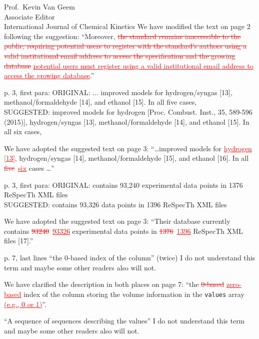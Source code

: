 \documentclass[11pt]{OSUletter}
\newcommand{\addtwo}[1]{{\sloppy\textcolor{red}{\uline{#1}}}}  %
\newcommand{\deletetwo}[1]{\sloppy\textcolor{red}{\sout{#1}}}    %
\begin{document}
\begin{letter}{
               Prof.~Kevin Van Geem\\
               Associate Editor\\
               International Journal of Chemical Kinetics
               }
We have modified the text on page 2 following the suggestion:
``Moreover, \deletetwo{the standard remains inaccessible to the public, requiring potential users
to register with the standard's authors using a valid institutional email address
to access the specification and the growing database}
\addtwo{potential users must register using a valid institutional email address
to access the growing database}.''

\begin{quoting}
    p. 3, first para:
    ORIGINAL:
    ... improved models for hydrogen/syngas [13], methanol/formaldehyde [14], and
    ethanol [15]. In all five cases, \\
    SUGGESTED:
    improved models for hydrogen [Proc. Combust. Inst.,  35, 589-596 (2015)],
    hydrogen/syngas [13], methanol/formaldehyde [14], and ethanol [15]. In all six cases,
\end{quoting}

We have adopted the suggested text on page 3:
``\ldots improved models for \addtwo{hydrogen [13]},
hydrogen\slash syngas [14], methanol\slash formaldehyde [15],
and ethanol [16]. In all \deletetwo{five}~\addtwo{six} cases \ldots''


\begin{quoting}
    p. 3, first para:
    ORIGINAL:
    contains 93,240 experimental data points in 1376 ReSpecTh XML files\\
    SUGGESTED:
    contains 93,326 data points in 1396 ReSpecTh XML files
\end{quoting}

We have adopted the suggested text on page 3:
``Their database currently contains \deletetwo{\num{93240}}~\addtwo{\num{93326}}
experimental data points in \deletetwo{1376}~\addtwo{1396}
ReSpecTh XML files [17].''

\begin{quoting}
    p. 7, last lines
    ``the 0-based index of the column'' (twice)
    I do not understand this term and maybe some other readers also will not.
\end{quoting}

We have clarified the description in both places on page 7:
``the \deletetwo{0-based} \addtwo{zero-based} index of the column storing the
volume information in the \texttt{values} array \addtwo{(e.g., 0 or 1)}''.

\begin{quoting}
    ``A sequence of sequences describing the values''
    I do not understand this term and maybe some other readers also will not.
\end{quoting}


\end{letter}
\end{document}
